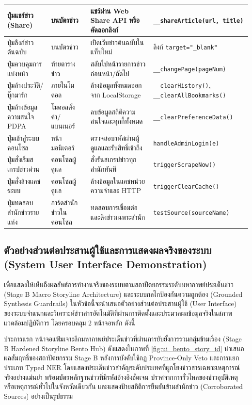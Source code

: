\begin{table}[H]
\begin{tabular}{|p{3.2cm}|p{2.6cm}|p{4.2cm}|p{3.8cm}|}
ปุ่มแชร์ข่าว (Share) & บนบัตรข่าว & แชร์ผ่าน Web Share API หรือคัดลอกลิงก์ & \texttt{\_\_shareArticle(url, title)} \\ \hline
ปุ่มลิงก์ข่าวต้นฉบับ & บนบัตรข่าว & เปิดเว็บข่าวต้นฉบับในแท็บใหม่ & ลิงก์ \texttt{target="\_blank"} \\ \hline
ปุ่มควบคุมการแบ่งหน้า & ท้ายตารางข่าว & สลับไปหน้ารายการข่าวก่อนหน้า/ถัดไป & \texttt{\_\_changePage(pageNum)} \\ \hline
ปุ่มล้างประวัติ/บุ๊กมาร์ก & ภายในโมดอล & ล้างข้อมูลทั้งหมดออกจาก LocalStorage & \texttt{\_\_clearHistory()}, \texttt{\_\_clearAllBookmarks()} \\ \hline
ปุ่มล้างข้อมูลความสนใจ PDPA & โมดอลตั้งค่า/แบนเนอร์ & ลบข้อมูลสถิติความสนใจและคุกกี้ทั้งหมด & \texttt{\_\_clearPreferenceData()} \\ \hline
ปุ่มเข้าสู่ระบบคอนโซล & หน้ามอนิเตอร์ & ตรวจสอบรหัสผ่านผู้ดูแลและรับสิทธิ์เข้าถึง & \texttt{handleAdminLogin(e)} \\ \hline
ปุ่มสั่งเริ่มสเกรปข่าวด่วน & คอนโซลผู้ดูแล & สั่งรันสเกรปข่าวทุกสำนักทันที & \texttt{triggerScrapeNow()} \\ \hline
ปุ่มสั่งล้างแคชระบบ & คอนโซลผู้ดูแล & ล้างข้อมูลในแคชหน่วยความจำและ HTTP & \texttt{triggerClearCache()} \\ \hline
ปุ่มทดสอบสำนักข่าวรายแห่ง & การ์ดสำนักข่าวในคอนโซล & ทดสอบการเชื่อมต่อและดึงข่าวเฉพาะสำนัก & \texttt{testSource(sourceName)} \\
\hline
\end{tabular}
\end{table}

\subsection{ตัวอย่างส่วนต่อประสานผู้ใช้และการแสดงผลจริงของระบบ (System User Interface Demonstration)}

เพื่อแสดงให้เห็นถึงผลลัพธ์การทำงานจริงของระบบตามสถาปัตยกรรมระดับมหากาพย์ประเด็นข่าว (Stage B Macro Storyline Architecture) และระบบกลไกป้องกันความถูกต้อง (Grounded Synthesis Guardrails) ในหัวข้อนี้จะนำเสนอตัวอย่างส่วนต่อประสานผู้ใช้ (User Interface) ของระบบจำแนกและวิเคราะห์ข่าวสารอัตโนมัติที่ผ่านการติดตั้งและประมวลผลข้อมูลจริงในสภาพแวดล้อมปฏิบัติการ โดยครอบคลุม 2 หน้าจอหลัก ดังนี้

ประการแรก หน้าจอแฟ้มเจาะลึกมหากาพย์ประเด็นข่าวที่ผ่านการยับยั้งการรวมกลุ่มข้ามเรื่อง (Stage B Hardened Storyline Bento Hub) ดังแสดงในภาพที่ \ref{fig:ui_bento_story_id} นำเสนอผลสัมฤทธิ์ของสถาปัตยกรรม Stage B หลังการบังคับใช้กฎ Province-Only Veto และการแยกประเภท Typed NER โดยแสดงประเด็นข่าวสำคัญระดับประเทศที่ผูกโยงข่าวสารเฉพาะเหตุการณ์จริงอย่างแม่นยำ พร้อมบัตรหลักฐานข่าวที่มีรหัสอ้างอิงชัดเจน ปราศจากการรั่วไหลของข่าวอุบัติเหตุหรือเหตุการณ์ทั่วไปในจังหวัดเดียวกัน และแสดงป้ายสถิติการยืนยันข้ามสำนักข่าว (Corroborated Sources) อย่างเป็นรูปธรรม

